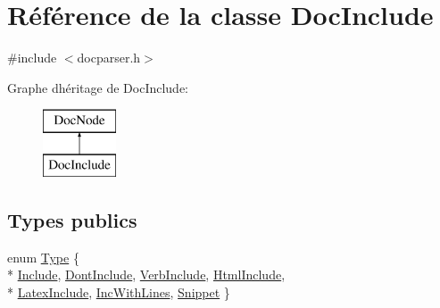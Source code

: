 \hypertarget{class_doc_include}{}\section{Référence de la classe Doc\+Include}
\label{class_doc_include}


{\ttfamily \#include $<$docparser.\+h$>$}

Graphe d\textquotesingle{}héritage de Doc\+Include\+:\begin{figure}[H]
\begin{center}
\leavevmode
\includegraphics[height=2.000000cm]{class_doc_include}
\end{center}
\end{figure}
\subsection*{Types publics}
\begin{DoxyCompactItemize}
\item 
enum \hyperlink{class_doc_include_a72aa0fd397546547aadf356348ff3eaf}{Type} \{ \\*
\hyperlink{class_doc_include_a72aa0fd397546547aadf356348ff3eafa2cc6c9824f61c186c983be390d3506a3}{Include}, 
\hyperlink{class_doc_include_a72aa0fd397546547aadf356348ff3eafae754cf246a0a671e43c28d1b36c87d9b}{Dont\+Include}, 
\hyperlink{class_doc_include_a72aa0fd397546547aadf356348ff3eafaaad4241a3cd52aa23aebf58063e2f610}{Verb\+Include}, 
\hyperlink{class_doc_include_a72aa0fd397546547aadf356348ff3eafaa5ea0461256f384958038fb6f8df3859}{Html\+Include}, 
\\*
\hyperlink{class_doc_include_a72aa0fd397546547aadf356348ff3eafa46758ee2c283cdfe24b17c2d2f11e8ee}{Latex\+Include}, 
\hyperlink{class_doc_include_a72aa0fd397546547aadf356348ff3eafa952cf9f1f8a7019693e43d6dd9230073}{Inc\+With\+Lines}, 
\hyperlink{class_doc_include_a72aa0fd397546547aadf356348ff3eafa00513d2ab0b78aa7aed51fb4ad1e3439}{Snippet}
 \}
\end{DoxyCompactItemize}
